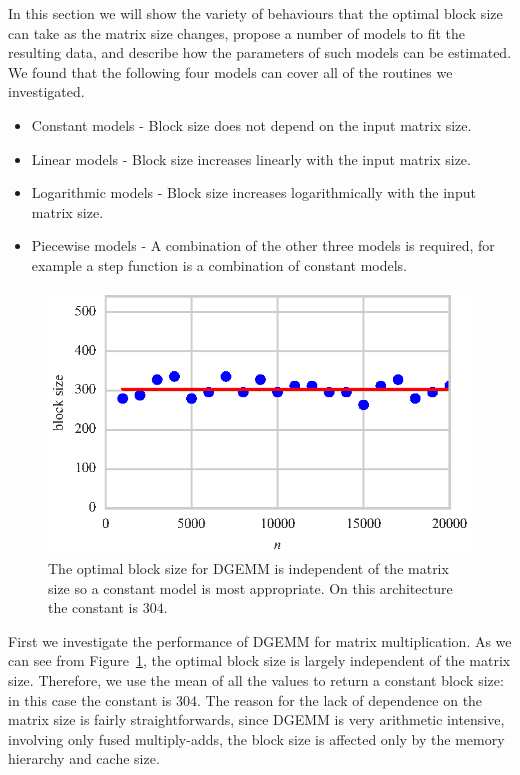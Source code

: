 \documentclass[a4paper,12pt]{article}
\begin{document}
In this section we will show the variety of behaviours
that the optimal block size can take as the matrix size changes,
propose a number of models to fit the resulting data,
and describe how the parameters of such models can be estimated.
We found that the following four models can cover all
of the routines we investigated.

\begin{itemize}
\item Constant models - Block size does not depend on the input matrix size.
\item Linear models - Block size increases linearly with the input matrix size.
\item Logarithmic models - Block size increases logarithmically with the
  input matrix size.
\item Piecewise models - A combination of the other three models is required,
  for example a step function is a combination of constant models.
\end{itemize}

\begin{figure}[ht]
  \centering
  \includegraphics[scale=1]{fig/curvefit_const.eps}
  \caption{The optimal block size for DGEMM is independent of the
    matrix size so a constant model is most appropriate.
    On this architecture the constant is $304$.}
  \label{fig.fit_const}
\end{figure}
First we investigate the performance of DGEMM
for matrix multiplication.
As we can see from Figure~\ref{fig.fit_const},
the optimal block size is largely independent of the matrix size.
Therefore, we use the mean of all the values to return a constant
block size:
in this case the constant is $304$.
The reason for the lack of dependence on the matrix size is
fairly straightforwards,
since DGEMM is very arithmetic intensive,
involving only fused multiply-adds,
the block size is affected only by the memory hierarchy
and cache size.
\end{document}
